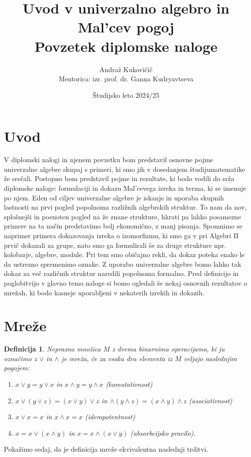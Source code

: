 \documentclass[a4paper,11pt]{article}
\title{Uvod v univerzalno algebro in Mal'cev pogoj \\ 
\Large Povzetek diplomske naloge}
\author{Andraž Kukovičič \\
Mentorica: izr. prof. dr. Ganna Kudryavtseva}
\date{Študijsko leto 2024/25}
\newtheorem{definicija}{Definicija}
\begin{document}


\maketitle

\section{Uvod}
V diplomski nalogi in njenem povzetku bom predstavil osnovne pojme univerzalne algebre skupaj s primeri, 
ki smo jih v dosedanjem študijumatematike že srečali. 
Postopno bom predstavil pojme in rezultate, ki bodo vodili do srža diplomske naloge:
formulaciji in dokazu Mal'cevega izreka in terma, ki se imenuje po njem.
Eden od ciljev univerzalne algebre je iskanje in uporaba skupnih lastnosti na prvi pogled popolnoma
razližnih algebrskih struktur. To nam da nov, splošnejši in poenoten pogled na že znane strukture, hkrati pa lahko 
posamezne primere na ta način predstavimo bolj ekonomično, z manj pisanja. 
Spomnimo se naprimer primera dokazovanja izreka o izomorfizmu, ki smo ga v pri Algebri II prvič dokazali za grupe, nato 
smo ga formulirali še za druge strukture npr. kolobarje, algebre, module. Pri tem smo običajno rekli, da dokaz poteka 
enako le da ustrezno spremenimo oznake. Z uporabo univerzalne algebre bomo lahko tak dokaz za več različnih struktur 
naredili popolnoma formalno. 
Pred definicijo in poglobitvijo v glavno temo naloge si bomo ogledali še nekaj osnovnih rezultatov o mrežah, ki bodo 
kasneje uporabljeni v nekaterih izrekih in dokazih. 

\section{Mreže}
\begin{definicija}
    Neprazna množica $M$ z dvema binarnima operacijama, ki ju označimo z $\vee$ in $\wedge$ je \emph{mreža}, če 
za vsaka dva elementa iz $M$ veljajo naslednjim pogojem:\\
\begin{enumerate} 
    \item[M1] $x \vee y = y \vee x$ in $x \wedge y = y \wedge x$ (komutativnost)
    \item[M2] $x\vee \left(y \vee z\right) = \left(x \vee y\right)\vee z$ in 
    $\wedge \left(y \wedge z\right) = \left(x \wedge y\right)\wedge z$ (asociativnost)
    \item[M3] $x \vee x = x$ in $x \wedge x = x$ (idempotentnost)
    \item[M4] $x = x \vee \left(x \wedge y\right)$ in $x = x \wedge \left(x \vee y\right)$ (absorbcijsko pravilo).\\
\end{enumerate}
\end{definicija}
Pokažimo sedaj, da je definicija mreže ekvivalentna naslednji trditvi.
\end{document}
